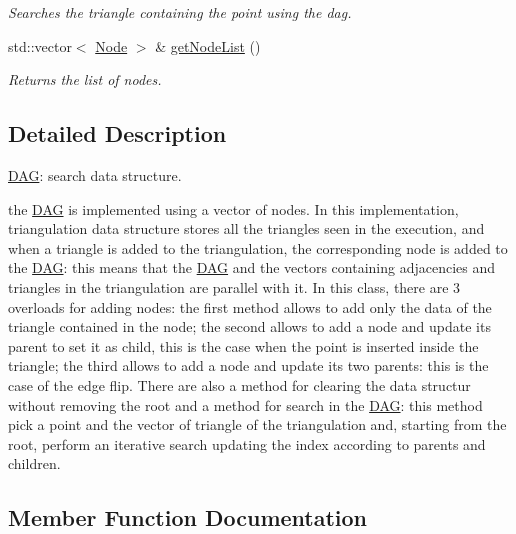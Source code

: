 \begin{DoxyCompactItemize}
\begin{DoxyCompactList}\small\item\em Searches the triangle containing the point using the dag. \end{DoxyCompactList}\item 
std\+::vector$<$ \hyperlink{classNode}{Node} $>$ \& \hyperlink{classDAG_af8afaefe800c1eb05ef631e148692c2d}{get\+Node\+List} ()
\begin{DoxyCompactList}\small\item\em Returns the list of nodes. \end{DoxyCompactList}\end{DoxyCompactItemize}


\subsection{Detailed Description}
\hyperlink{classDAG}{D\+AG}\+: search data structure. 

the \hyperlink{classDAG}{D\+AG} is implemented using a vector of nodes. In this implementation, triangulation data structure stores all the triangles seen in the execution, and when a triangle is added to the triangulation, the corresponding node is added to the \hyperlink{classDAG}{D\+AG}\+: this means that the \hyperlink{classDAG}{D\+AG} and the vectors containing adjacencies and triangles in the triangulation are parallel with it. In this class, there are 3 overloads for adding nodes\+: the first method allows to add only the data of the triangle contained in the node; the second allows to add a node and update its parent to set it as child, this is the case when the point is inserted inside the triangle; the third allows to add a node and update its two parents\+: this is the case of the edge flip. There are also a method for clearing the data structur without removing the root and a method for search in the \hyperlink{classDAG}{D\+AG}\+: this method pick a point and the vector of triangle of the triangulation and, starting from the root, perform an iterative search updating the index according to parents and children. 

\subsection{Member Function Documentation}
\mbox{\label{classDAG_aed6fe76f8e3400755b063bc0d0152955}} 
